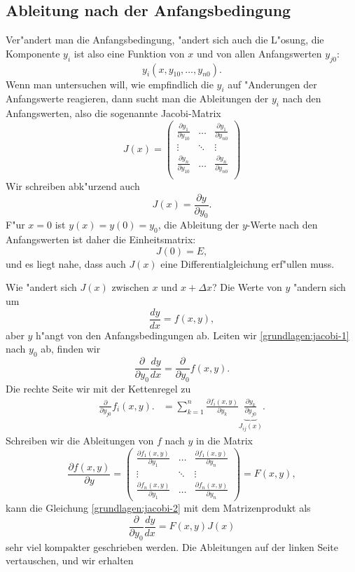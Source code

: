 \subsection{Ableitung nach der Anfangsbedingung\label{grundlagen:jacobi}}
%
Ver"andert man die Anfangsbedingung, "andert sich auch die L"osung,
die Komponente $y_i$ ist also eine Funktion von $x$ und
von allen Anfangswerten $y_{j0}$:
\[
y_i(x, y_{10},\dots,y_{n0}).
\]
Wenn man untersuchen will, wie empfindlich die $y_i$ auf "Anderungen
der Anfangswerte reagieren, dann sucht man die Ableitungen der $y_i$
nach den Anfangswerten, also die sogenannte Jacobi-Matrix
%
\[
J(x)
=
\begin{pmatrix}
\displaystyle\frac{\partial y_1}{\partial y_{10}}&\dots&
	\displaystyle\frac{\partial y_1}{\partial y_{n0}}\\
\vdots&\ddots&\vdots\\
\displaystyle\frac{\partial y_n}{\partial y_{10}}&\dots&
	\displaystyle\frac{\partial y_n}{\partial y_{n0}}\\
\end{pmatrix}
\]
Wir schreiben abk"urzend auch 
\[
J(x)= \frac{\partial y}{\partial y_0}.
\]
F"ur $x=0$ ist $y(x)=y(0)=y_0$, die Ableitung der $y$-Werte nach den
Anfangswerten ist daher die Einheitsmatrix:
\[
J(0)=E,
\]
und es liegt nahe, dass auch $J(x)$ eine Differentialgleichung erf"ullen
muss.

Wie "andert sich $J(x)$ zwischen $x$ und $x+\Delta x$?
Die Werte von $y$ "andern sich um
\begin{equation}
\frac{dy}{dx}= f(x,y),
\label{grundlagen:jacobi-1}
\end{equation}
aber $y$ h"angt von den Anfangsbedingungen ab.
Leiten wir \eqref{grundlagen:jacobi-1} nach $y_0$ ab, finden wir
\begin{equation}
\frac{\partial}{\partial y_0}\frac{dy}{dx}
=
\frac{\partial}{\partial y_0}f(x,y).
\label{grundlagen:jacobi-2}
\end{equation}
Die rechte Seite wir mit der Kettenregel zu
\begin{align*}
\frac{\partial}{\partial y_{j0}}f_i(x,y).
&=
\sum_{k=1}^n \frac{\partial f_i(x,y)}{\partial y_{k}}
\underbrace{\frac{\partial y_k}{\partial y_{j0}}}_{\displaystyle J_{ij}(x)}.
\end{align*}
Schreiben wir die Ableitungen von $f$ nach $y$ in die Matrix
\[
\frac{\partial f(x,y)}{\partial y}
=
\begin{pmatrix}
\displaystyle\frac{\partial f_1(x,y)}{\partial y_1}&\dots&
	\displaystyle\frac{\partial f_1(x,y)}{\partial y_n}\\
\vdots&\ddots&\vdots\\
\displaystyle\frac{\partial f_n(x,y)}{\partial y_1}&\dots&
	\displaystyle\frac{\partial f_n(x,y)}{\partial y_n}
\end{pmatrix}
=F(x,y),
\]
kann die Gleichung \eqref{grundlagen:jacobi-2} mit dem Matrizenprodukt als
\begin{equation*}
\frac{\partial}{\partial y_0}\frac{dy}{dx}
=
F(x,y)J(x)
\end{equation*}
sehr viel kompakter geschrieben werden.
Die Ableitungen auf der linken Seite vertauschen, und wir erhalten

